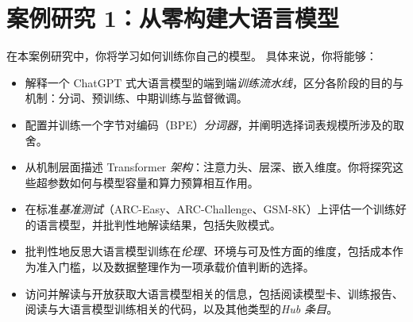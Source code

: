 % 

\lstset{
  basicstyle=\ttfamily\footnotesize,
  breaklines=true,
  frame=single,
  numbers=left,
  numberstyle=\tiny,
  xleftmargin=2em,
  framexleftmargin=2em,
}




\chapter{案例研究 1：从零构建大语言模型}
\label{ch:nanochat}
    
\begin{learningbox}
在本案例研究中，你将学习如何训练你自己的模型。
具体来说，你将能够：
\begin{itemize}[leftmargin=*, nosep]
    \item 解释一个 ChatGPT 式大语言模型的端到端{\em 训练流水线}，区分各阶段的目的与机制：分词、预训练、中期训练与监督微调。
    \item 配置并训练一个字节对编码（BPE）{\em 分词器}，并阐明选择词表规模所涉及的取舍。
    \item 从机制层面描述 Transformer {\em 架构}：注意力头、层深、嵌入维度。你将探究这些超参数如何与模型容量和算力预算相互作用。
    \item 在标准{\em 基准测试}（ARC-Easy、ARC-Challenge、GSM-8K）上评估一个训练好的语言模型，并批判性地解读结果，包括失败模式。
    \item 批判性地反思大语言模型训练在{\em 伦理}、环境与可及性方面的维度，包括成本作为准入门槛，以及数据整理作为一项承载价值判断的选择。
    \item 访问并解读与开放获取大语言模型相关的信息，包括阅读模型卡、训练报告、阅读与大语言模型训练相关的代码，以及其他类型的{\em Hub 条目}。
\end{itemize}
\end{learningbox}


